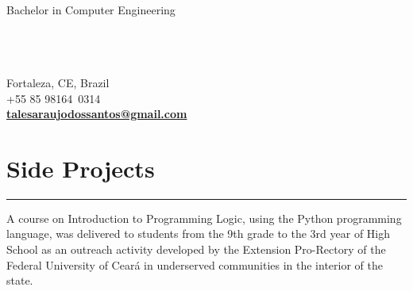 \documentclass[]{rahulworld-resume}
\begin{document}
\begin{minipage}[t]{0.33\textwidth}
\begin{large}
	\\
\end{large}
Bachelor in Computer Engineering\\
\\

%
%

\end{minipage}
\hfill
\begin{minipage}[t]{0.66\textwidth}
\hspace*{0pt}\hfill    \\
\hspace*{0pt}\hfill    \\
\hspace*{0pt}\hfill Fortaleza, CE, Brazil \\
\hspace*{0pt}\hfill  +55 85 98164\ 0314 \\
\hspace*{0pt}\hfill \textbf{\href{mailto:talesaraujodossantos@gmail.com}{talesaraujodossantos@gmail.com}} \\

\section{Side Projects}
\noindent\rule{12.5cm}{0.4pt}
 
\noindent
\hspace{5em}%
\begin{minipage}{0.85\textwidth\vspace{5pt}}
A course on Introduction to Programming Logic, using the Python programming language, was delivered to students from the 9th grade to the 3rd year of High School as an outreach activity developed by the Extension Pro-Rectory of the Federal University of Ceará in underserved communities in the interior of the state.
\end{minipage}
\sectionsep

\end{minipage}
\end{document}
